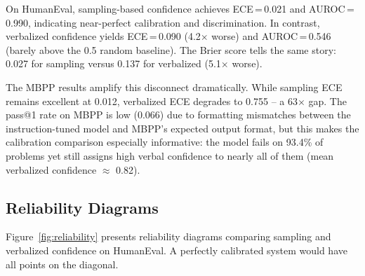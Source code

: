 \documentclass{article}
\begin{document}
On HumanEval, sampling-based confidence achieves ECE\,=\,0.021 and AUROC\,=\,0.990, indicating near-perfect calibration and discrimination. In contrast, verbalized confidence yields ECE\,=\,0.090 (4.2$\times$ worse) and AUROC\,=\,0.546 (barely above the 0.5 random baseline). The Brier score tells the same story: 0.027 for sampling versus 0.137 for verbalized (5.1$\times$ worse).

The MBPP results amplify this disconnect dramatically. While sampling ECE remains excellent at 0.012, verbalized ECE degrades to 0.755 -- a 63$\times$ gap. The pass@1 rate on MBPP is low (0.066) due to formatting mismatches between the instruction-tuned model and MBPP's expected output format, but this makes the calibration comparison especially informative: the model fails on 93.4\% of problems yet still assigns high verbal confidence to nearly all of them (mean verbalized confidence $\approx$ 0.82).

\subsection{Reliability Diagrams}

Figure~\ref{fig:reliability} presents reliability diagrams comparing sampling and verbalized confidence on HumanEval. A perfectly calibrated system would have all points on the diagonal.
\end{document}
